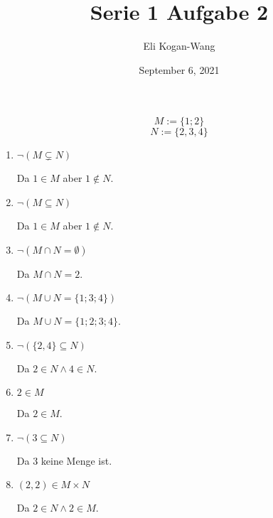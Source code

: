 \documentclass[a4paper,12pt]{article}
\title{Serie 1 Aufgabe 2}
\author{Eli Kogan-Wang}
\date{September 6, 2021}
\begin{document}
$$M:=\{1;2\}$$
$$N:=\{2,3,4\}$$

\begin{enumerate}[label=(\roman*)]
  \item $\neg(M\subsetneq N)$

        Da $1\in M$ aber $1\not\in N$.
  \item $\neg(M\subseteq N)$

        Da $1\in M$ aber $1\not\in N$.
  \item $\neg(M\cap N=\emptyset)$

        Da $M\cap N={2}$.
  \item $\neg(M\cup N=\{1;3;4\})$

        Da $M\cup N = \{1;2;3;4\}$.
  \item $\neg(\{2, 4\}\subseteq N)$

        Da $2\in N\land 4\in N$.
  \item $2\in M$

        Da $2\in M$.
  \item $\neg(3 \subseteq N)$

        Da 3 keine Menge ist.
  \item $(2, 2) \in M \times N$

        Da $2\in N\land2\in M$.
\end{enumerate}
\end{document}

